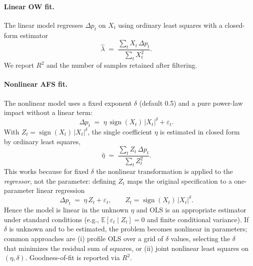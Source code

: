 \documentclass{article}
\begin{document}
\paragraph{Linear OW fit.} The linear model regresses \(\Delta p_t\) on \(X_t\) using ordinary least squares with a closed-form estimator
\begin{equation}
\hat{\lambda} \;=\; \frac{\sum_t X_t\,\Delta p_t}{\sum_t X_t^2}.
\end{equation}
We report \(R^2\) and the number of samples retained after filtering.

\paragraph{Nonlinear AFS fit.} The nonlinear model uses a fixed exponent \(\delta\) (default 0.5) and a pure power-law impact without a linear term:
\begin{equation}
\Delta p_t \;=\; \eta\,\operatorname{sign}(X_t)\,|X_t|^{\delta} + \varepsilon_t.
\end{equation}
With $Z_t = \operatorname{sign}(X_t)\,|X_t|^{\delta}$, the single coefficient $\eta$ is estimated in closed form by ordinary least squares,
\begin{equation}
\hat{\eta} \;=\; \frac{\sum_t Z_t\,\Delta p_t}{\sum_t Z_t^2}.
\end{equation}
This works because for fixed $\delta$ the nonlinear transformation is applied to the \emph{regressor}, not the parameter: defining $Z_t$ maps the original specification to a one-parameter linear regression
\begin{equation}
\Delta p_t \;=\; \eta\, Z_t + \varepsilon_t, \qquad Z_t = \operatorname{sign}(X_t)\,|X_t|^{\delta}.
\end{equation}
Hence the model is linear in the unknown $\eta$ and OLS is an appropriate estimator under standard conditions (e.g., $\mathbb E[\varepsilon_t\mid Z_t]=0$ and finite conditional variance). If $\delta$ is unknown and to be estimated, the problem becomes nonlinear in parameters; common approaches are (i) profile OLS over a grid of $\delta$ values, selecting the $\delta$ that minimizes the residual sum of squares, or (ii) joint nonlinear least squares on $(\eta,\delta)$.
Goodness-of-fit is reported via $R^2$.
\end{document}
